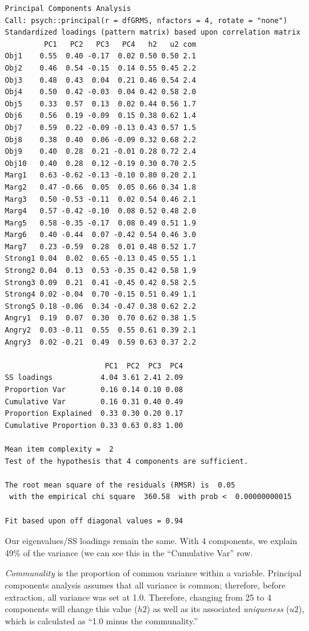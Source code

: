 \documentclass[
  english,
]{book}
\begin{document}
\begin{verbatim}
Principal Components Analysis
Call: psych::principal(r = dfGRMS, nfactors = 4, rotate = "none")
Standardized loadings (pattern matrix) based upon correlation matrix
         PC1   PC2   PC3   PC4   h2   u2 com
Obj1    0.55  0.40 -0.17  0.02 0.50 0.50 2.1
Obj2    0.46  0.54 -0.15  0.14 0.55 0.45 2.2
Obj3    0.48  0.43  0.04  0.21 0.46 0.54 2.4
Obj4    0.50  0.42 -0.03  0.04 0.42 0.58 2.0
Obj5    0.33  0.57  0.13  0.02 0.44 0.56 1.7
Obj6    0.56  0.19 -0.09  0.15 0.38 0.62 1.4
Obj7    0.59  0.22 -0.09 -0.13 0.43 0.57 1.5
Obj8    0.38  0.40  0.06 -0.09 0.32 0.68 2.2
Obj9    0.40  0.28  0.21 -0.01 0.28 0.72 2.4
Obj10   0.40  0.28  0.12 -0.19 0.30 0.70 2.5
Marg1   0.63 -0.62 -0.13 -0.10 0.80 0.20 2.1
Marg2   0.47 -0.66  0.05  0.05 0.66 0.34 1.8
Marg3   0.50 -0.53 -0.11  0.02 0.54 0.46 2.1
Marg4   0.57 -0.42 -0.10  0.08 0.52 0.48 2.0
Marg5   0.58 -0.35 -0.17  0.08 0.49 0.51 1.9
Marg6   0.40 -0.44  0.07 -0.42 0.54 0.46 3.0
Marg7   0.23 -0.59  0.28  0.01 0.48 0.52 1.7
Strong1 0.04  0.02  0.65 -0.13 0.45 0.55 1.1
Strong2 0.04  0.13  0.53 -0.35 0.42 0.58 1.9
Strong3 0.09  0.21  0.41 -0.45 0.42 0.58 2.5
Strong4 0.02 -0.04  0.70 -0.15 0.51 0.49 1.1
Strong5 0.18 -0.06  0.34 -0.47 0.38 0.62 2.2
Angry1  0.19  0.07  0.30  0.70 0.62 0.38 1.5
Angry2  0.03 -0.11  0.55  0.55 0.61 0.39 2.1
Angry3  0.02 -0.21  0.49  0.59 0.63 0.37 2.2

                       PC1  PC2  PC3  PC4
SS loadings           4.04 3.61 2.41 2.09
Proportion Var        0.16 0.14 0.10 0.08
Cumulative Var        0.16 0.31 0.40 0.49
Proportion Explained  0.33 0.30 0.20 0.17
Cumulative Proportion 0.33 0.63 0.83 1.00

Mean item complexity =  2
Test of the hypothesis that 4 components are sufficient.

The root mean square of the residuals (RMSR) is  0.05 
 with the empirical chi square  360.58  with prob <  0.00000000015 

Fit based upon off diagonal values = 0.94
\end{verbatim}

Our eigenvalues/SS loadings remain the same. With 4 components, we explain 49\% of the variance (we can see this in the ``Cumulative Var'' row.

\emph{Communality} is the proportion of common variance within a variable. Principal components analysis assumes that all variance is common; therefore, before extraction, all variance was set at 1.0. Therefore, changing from 25 to 4 components will change this value (\(h2\)) as well as its associated \emph{uniqueness} (\(u2\)), which is calculated as ``1.0 minus the communality.''
\end{document}
